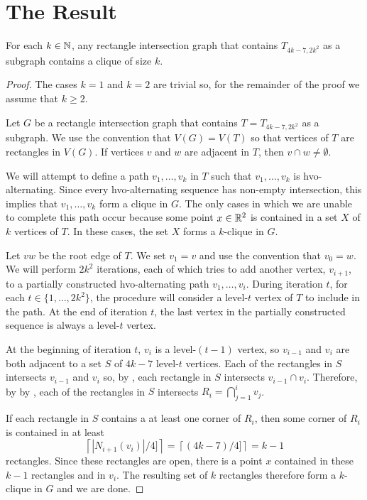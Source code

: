 \documentclass[lotsofwhite]{patmorin}
\newcommand{\iters}{2k^2}
\begin{document}
\section{The Result}

\begin{thm}
  For each $k\in \mathbb{N}$, any rectangle intersection graph that contains
  $T_{4k-7,\iters}$ as a subgraph contains a clique of size $k$.
\end{thm}

\begin{proof}
  The cases $k=1$ and $k=2$ are trivial so, for the remainder of the proof
  we assume that $k\ge 2$.

  Let $G$ be a rectangle intersection graph that contains
  $T=T_{4k-7,\iters}$ as a subgraph.  We use the convention that
  $V(G)=V(T)$ so that vertices of $T$ are rectangles in $V(G)$.  If
  vertices $v$ and $w$ are adjacent in $T$, then $v\cap w \neq\emptyset$.

  We will attempt to define a path $v_1,\ldots,v_k$ in $T$ such that
  $v_1,\ldots,v_k$ is hvo-alternating. Since every hvo-alternating
  sequence has  non-empty intersection, this implies that $v_1,\ldots,v_k$
  form a clique in $G$.  The only cases in which we are unable to complete
  this path occur because some point $x\in\mathbb{R}^2$ is contained in a set $X$
  of $k$ vertices of $T$.  In these cases, the set $X$ forms a $k$-clique
  in $G$.

  Let $vw$ be the root edge of $T$. We set $v_1=v$ and use the convention
  that $v_0=w$.  We will perform $\iters$ iterations, each of which
  tries to add another vertex, $v_{i+1}$, to a partially constructed
  hvo-alternating path $v_1,\ldots,v_i$. During iteration $t$, for
  each $t\in\{1,\ldots,\iters\}$, the procedure will consider a
  level-$t$ vertex of $T$ to include in the path.  At the end of
  iteration $t$, the last vertex in the partially constructed sequence
  is always a level-$t$ vertex.

  At the beginning of iteration $t$, $v_i$ is a level-$(t-1)$ vertex, so
  $v_{i-1}$ and $v_i$ are both adjacent to a set $S$ of $4k-7$ level-$t$
  vertices.  Each of the rectangles in $S$ intersects $v_{i-1}$ and
  $v_i$ so, by , each rectangle in $S$ intersects
  $v_{i-1}\cap v_i$.  Therefore, by by , each of
  the rectangles in $S$ intersects $R_i=\bigcap_{j=1}^i v_j$.

  If each rectangle in $S$ contains a
  at least one corner of $R_i$, then some corner of $R_i$ is contained 
  in at least
  \[  \left\lceil |N_{i+1}(v_i)|/4]\right\rceil 
         = \left\lceil(4k-7)/4]\right\rceil = k-1
  \]
  rectangles.  Since these rectangles are open, there is a point $x$
  contained in these $k-1$ rectangles and in $v_{i}$.  The resulting set
  of $k$ rectangles therefore form a $k$-clique in $G$ and we are done.


\end{proof}
\end{document}
